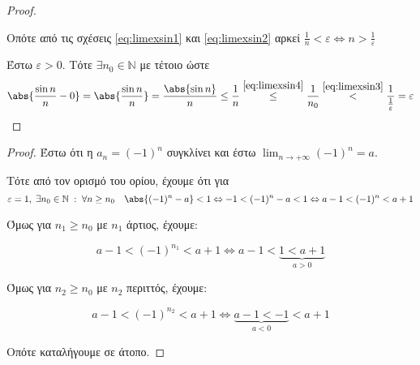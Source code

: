 \documentclass[main.tex]{subfiles}
\begin{document}
\begin{examples}
\begin{enumerate}[i)]
\begin{proof}
\begin{description}
                        Οπότε από τις σχέσεις \eqref{eq:limexsin1} και 
                        \eqref{eq:limexsin2} αρκεί $ \frac{1}{n} < 
                        \varepsilon \Leftrightarrow n > \frac{1}{
                        \varepsilon} $
                \end{description}

                Έστω $ \varepsilon >0 $. Τότε $ \exists n_{0} \in \mathbb{N}
                $ με  τέτοιο ώστε
                \[
                    \abs{\frac{\sin{n}}{n} - 0} =  \abs{\frac{\sin{n}}{n}} =
                    \frac{\abs{\sin{n}}}{n} \leq \frac{1}{n}
                    \overset{\eqref{eq:limexsin4}}{\leq}  \frac{1}{n_{0}}
                    \overset{\eqref{eq:limexsin3}}{<}
                    \frac{1}{\frac{1}{\varepsilon}
                    } = \varepsilon 
                \] 
            \end{proof}
    \end{enumerate}
\end{examples}

\pagebreak


\begin{proof}
\item {}
    Έστω ότι η $ a_{n}= (-1)^{n} $ συγκλίνει και έστω $ \lim_{n \to +
    \infty}(-1)^{n} = a $. 

    Τότε από τον ορισμό του ορίου, έχουμε ότι για 
    \[ 
        \varepsilon = 1, \; \exists n_{0} \in \mathbb{N} \; : \; \forall 
        n \geq n_{0} \quad \abs{(-1)^{n}-a} < 1 \Leftrightarrow -1 < 
        (-1)^{n} -a < 1 \Leftrightarrow a-1 < (-1)^{n} < a+1
    \]

    Όμως για $ n_{1} \geq n_{0} $ με $ n_{1} $ άρτιος, έχουμε:

    \[
        a-1 <  (-1)^{n_{1}} < a+1 \Leftrightarrow a-1 < 
        \underbrace{1 < a+1}_{a>0} 
    \] 

    Όμως για $ n_{2} \geq n_{0} $ με $ n_{2} $ περιττός, έχουμε:

    \[
        a-1 <  (-1)^{n_{2}} < a+1 \Leftrightarrow 
        \underbrace{a-1 < -1}_{a<0} < a+1
    \] 

    Οπότε καταλήγουμε σε άτοπο.
\end{proof}


\end{document}
